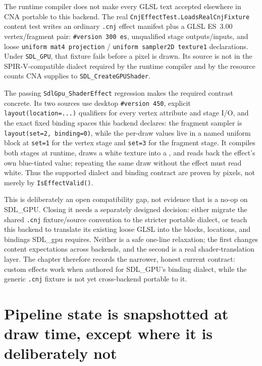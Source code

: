 The runtime compiler does not make every GLSL text accepted elsewhere in CNA portable to this
backend. The real \texttt{CnjEffectTest.LoadsRealCnjFixture} content test writes an ordinary
\texttt{.cnj} effect manifest plus a GLSL ES~3.00 vertex/fragment pair: \texttt{\#version 300 es},
unqualified stage outputs/inputs, and loose \texttt{uniform mat4 projection} /
\texttt{uniform sampler2D texture1} declarations. Under \texttt{SDL\_GPU}, that fixture fails
before a pixel is drawn. Its source is not in the SPIR-V-compatible dialect required by the
runtime compiler and by the resource counts CNA supplies to \texttt{SDL\_CreateGPUShader}.

The passing \texttt{SdlGpu\_ShaderEffect} regression makes the required contrast concrete. Its
two sources use desktop \texttt{\#version 450}, explicit \texttt{layout(location=...)} qualifiers
for every vertex attribute and stage I/O, and the exact fixed binding spaces this backend
declares: the fragment sampler is \texttt{layout(set=2, binding=0)}, while the per-draw values
live in a named uniform block at \texttt{set=1} for the vertex stage and \texttt{set=3} for the
fragment stage. It compiles both stages at runtime, draws a white texture into a
, and reads back the effect's own blue-tinted value; repeating the
same draw without the effect must read white. Thus the supported dialect and binding contract
are proven by pixels, not merely by \texttt{IsEffectValid()}.

This is deliberately an open compatibility gap, not evidence that  is a
no-op on SDL\_GPU. Closing it needs a separately designed decision: either migrate the shared
\texttt{.cnj} fixture/source convention to the stricter portable dialect, or teach this backend
to translate its existing loose GLSL into the blocks, locations, and bindings SDL\_gpu requires.
Neither is a safe one-line relaxation; the first changes content expectations across backends,
and the second is a real shader-translation layer. The chapter therefore records the narrower,
honest current contract: custom effects work when authored for SDL\_GPU's binding dialect, while
the generic \texttt{.cnj} fixture is not yet cross-backend portable to it.

\section{Pipeline state is snapshotted at draw time, except where it is deliberately not}

